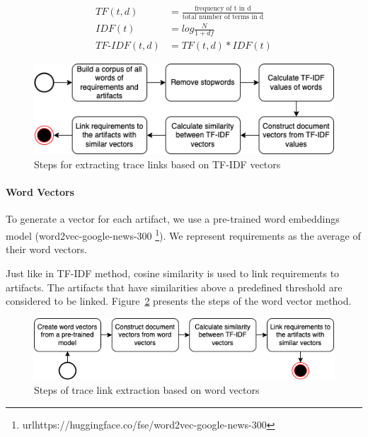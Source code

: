   \begin{align}
    TF(t,d) &= \frac{\text{frequency of t in d}}{\text{total number of terms in d}} \label{eq:tf} \\
    IDF(t) &= log\frac{N}{1+df} \label{eq:idf}\\
    TF\text{-}IDF(t,d) &= TF(t,d)*IDF(t) \label{eq:tfidf}
  \end{align}

      \begin{figure}[H]
        \centering
        \includegraphics[width=0.95\linewidth]{figs/tfidfvector2.png}
        \caption{Steps for extracting trace links based on TF-IDF vectors}
        \label{fig:tfidfvec}
      \end{figure}

      \paragraph{Word Vectors} To generate a vector for each artifact, we use a pre-trained word embeddings model (word2vec-google-news-300 \footnote{url{https://huggingface.co/fse/word2vec-google-news-300}}). 
      We represent requirements as the average of their word vectors. 

      Just like in TF-IDF method, cosine similarity is used to link requirements to artifacts.
      The artifacts that have similarities above a predefined threshold are considered to be linked. 
      Figure~\ref{fig:wordvec} presents the steps of the word vector method.

       \begin{figure}[htb]
        \centering
        \includegraphics[width=0.99\linewidth]{figs/wordvector.png}
        \caption{Steps of trace link extraction based on word vectors}
        \label{fig:wordvec}
      \end{figure}



